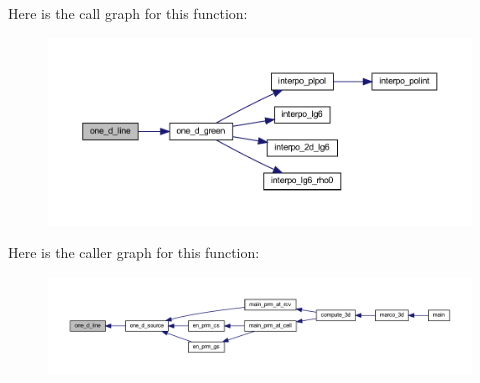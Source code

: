 Here is the call graph for this function\+:
\nopagebreak
\begin{figure}[H]
\begin{center}
\leavevmode
\includegraphics[width=350pt]{Marco_8f90_a74c7c00c978f674115ec54ae3c5f1870_cgraph}
\end{center}
\end{figure}
Here is the caller graph for this function\+:
\nopagebreak
\begin{figure}[H]
\begin{center}
\leavevmode
\includegraphics[width=350pt]{Marco_8f90_a74c7c00c978f674115ec54ae3c5f1870_icgraph}
\end{center}
\end{figure}
\mbox{\label{Marco_8f90_a46b85cd0c09e93d5bc756ae19f71f302}} 

